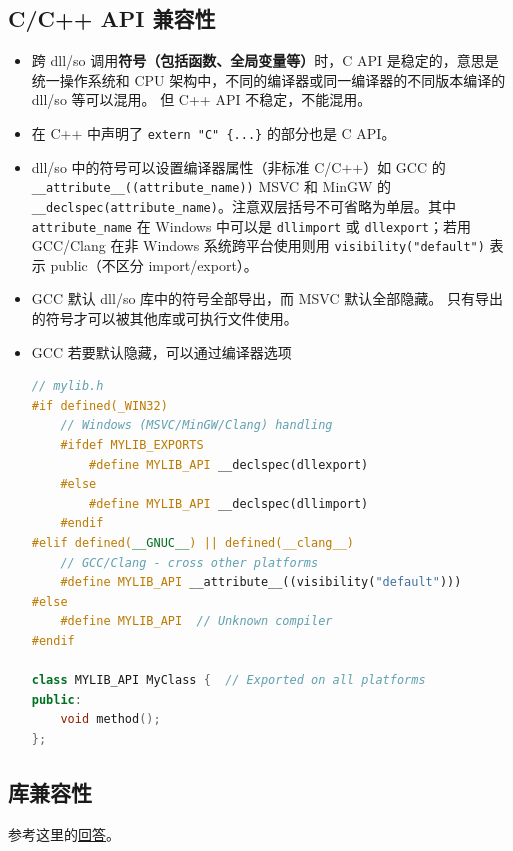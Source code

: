 \subsection{C/C++ API 兼容性}
\begin{itemize}
\item 跨 dll/so 调用\textbf{符号（包括函数、全局变量等）}时，C API 是稳定的，意思是统一操作系统和 CPU 架构中，不同的编译器或同一编译器的不同版本编译的 dll/so 等可以混用。 但 C++ API 不稳定，不能混用。
\item 在 C++ 中声明了 \verb`extern "C" {...}` 的部分也是 C API。
\item dll/so 中的符号可以设置编译器属性（非标准 C/C++）如 GCC 的 \verb`__attribute__((attribute_name))` MSVC 和 MinGW 的 \verb`__declspec(attribute_name)`。注意双层括号不可省略为单层。其中 \verb`attribute_name` 在 Windows 中可以是 \verb`dllimport` 或 \verb`dllexport`；若用 GCC/Clang 在非 Windows 系统跨平台使用则用 \verb`visibility("default")` 表示 public（不区分 import/export）。
\item GCC 默认 dll/so 库中的符号全部导出，而 MSVC 默认全部隐藏。 只有导出的符号才可以被其他库或可执行文件使用。
\item GCC 若要默认隐藏，可以通过编译器选项
\begin{lstlisting}[language=cpp]
// mylib.h
#if defined(_WIN32)
    // Windows (MSVC/MinGW/Clang) handling
    #ifdef MYLIB_EXPORTS
        #define MYLIB_API __declspec(dllexport)
    #else
        #define MYLIB_API __declspec(dllimport)
    #endif
#elif defined(__GNUC__) || defined(__clang__)
    // GCC/Clang - cross other platforms
    #define MYLIB_API __attribute__((visibility("default")))
#else
    #define MYLIB_API  // Unknown compiler
#endif

class MYLIB_API MyClass {  // Exported on all platforms
public:
    void method();
};
\end{lstlisting}
\end{itemize}

\subsection{库兼容性}
参考这里的\href{https://stackoverflow.com/questions/20183883/determining-binary-compatibility-under-linux}{回答}。

